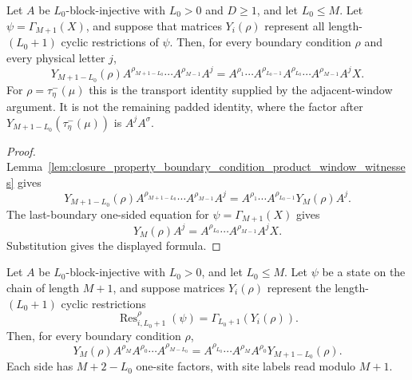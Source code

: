 \begin{lemma}
    \label{lem:boundary_transport_wrapped_product_ground_space_map}
    \leanok
    Let $A$ be $L_0$-block-injective with $L_0>0$ and $D\ge1$, and let
    $L_0\le M$.  Let $\psi=\Gamma_{M+1}(X)$, and suppose that matrices
    $Y_i(\rho)$ represent all length-$(L_0+1)$ cyclic restrictions of $\psi$.
    Then, for every boundary condition $\rho$ and every physical letter $j$,
    \[
        Y_{M+1-L_0}(\rho)
        A^{\rho_{M+1-L_0}}\cdots A^{\rho_{M-1}}A^j
        =
        A^{\rho_1}\cdots A^{\rho_{L_0-1}}
        A^{\rho_{L_0}}\cdots A^{\rho_{M-1}}A^jX .
    \]
    For $\rho=\tau^-_\eta(\mu)$ this is the transport identity supplied by the
    adjacent-window argument.  It is not the remaining padded identity, where
    the factor after $Y_{M+1-L_0}(\tau^-_\eta(\mu))$ is \(A^jA^\sigma\).
\end{lemma}

\begin{proof}
    \leanok
    Lemma~\ref{lem:closure_property_boundary_condition_product_window_witnesses}
    gives
    \[
        Y_{M+1-L_0}(\rho)
        A^{\rho_{M+1-L_0}}\cdots A^{\rho_{M-1}}A^j
        =
        A^{\rho_1}\cdots A^{\rho_{L_0-1}}Y_M(\rho)A^j .
    \]
    The last-boundary one-sided equation for $\psi=\Gamma_{M+1}(X)$ gives
    \[
        Y_M(\rho)A^j
        =
        A^{\rho_{L_0}}\cdots A^{\rho_{M-1}}A^jX .
    \]
    Substitution gives the displayed formula.
\end{proof}

\begin{lemma}
    \label{lem:closure_property_boundary_condition_long_product_window_witnesses}
    \leanok
    Let $A$ be $L_0$-block-injective with $L_0>0$, and let $L_0\le M$. Let
    $\psi$ be a state on the chain of length $M+1$, and suppose matrices
    $Y_i(\rho)$ represent the length-$(L_0+1)$ cyclic restrictions
    \[
        \operatorname{Res}^{\rho}_{i,L_0+1}(\psi)
        =
        \Gamma_{L_0+1}(Y_i(\rho)).
    \]
    Then, for every boundary condition $\rho$,
    \[
        Y_M(\rho)A^{\rho_M}A^{\rho_0}\cdots A^{\rho_{M-L_0}}
        =
        A^{\rho_{L_0}}\cdots A^{\rho_M}A^{\rho_0}
        Y_{M+1-L_0}(\rho).
    \]
    Each side has $M+2-L_0$ one-site factors, with site labels read modulo
    $M+1$.
\end{lemma}

